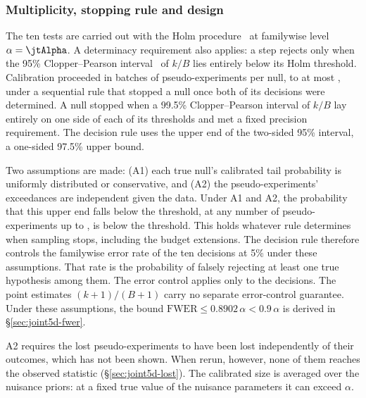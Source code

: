 \subsubsection{Multiplicity, stopping rule and design}

The ten tests are carried out with the Holm procedure~\cite{Holm:1979} at familywise level $\alpha=\jtAlpha$. A determinacy requirement also applies: a step rejects only when the 95\% Clopper--Pearson interval~\cite{Clopper:1934} of $k/B$ lies entirely below its Holm threshold. Calibration proceeded in batches of \jtBatch{} pseudo-experiments per null, to at most \jtBcap{}, under a sequential rule that stopped a null once both of its decisions were determined. A null stopped when a 99.5\% Clopper--Pearson interval of $k/B$ lay entirely on one side of each of its thresholds and met a fixed precision requirement. The decision rule uses the upper end of the two-sided 95\% interval, a one-sided 97.5\% upper bound.

Two assumptions are made: (A1) each true null's calibrated tail probability is uniformly distributed or conservative, and (A2) the pseudo-experiments' exceedances are independent given the data. Under A1 and A2, the probability that this upper end falls below the threshold, at any number of pseudo-experiments up to \jtBcap{}, is below the threshold. This holds whatever rule determines when sampling stops, including the budget extensions. The decision rule therefore controls the familywise error rate of the ten decisions at 5\% under these assumptions. That rate is the probability of falsely rejecting at least one true hypothesis among them. The error control applies only to the decisions. The point estimates $(k+1)/(B+1)$ carry no separate error-control guarantee. Under these assumptions, the bound $\mathrm{FWER}\le0.8902\,\alpha<0.9\,\alpha$ is derived in \S\ref{sec:joint5d-fwer}.

A2 requires the lost pseudo-experiments to have been lost independently of their outcomes, which has not been shown. When rerun, however, none of them reaches the observed statistic (\S\ref{sec:joint5d-lost}). The calibrated size is averaged over the nuisance priors: at a fixed true value of the nuisance parameters it can exceed $\alpha$.

